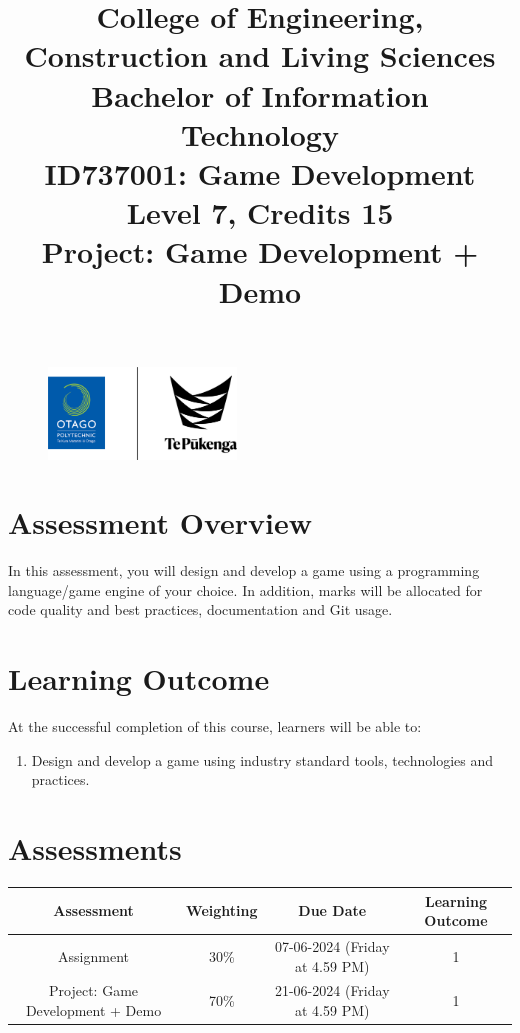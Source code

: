 \documentclass{article}
\author{}
\begin{document}
\begin{figure}
	\centering
	\includegraphics[width=50mm]{../../resources/img/logo.png}
\end{figure}

\title{College of Engineering, Construction and Living Sciences\\Bachelor of Information Technology\\ID737001: Game Development\\Level 7, Credits 15\\\textbf{Project: Game Development + Demo}}
\date{}
\maketitle

\section*{Assessment Overview}
In this assessment, you will design and develop a game using a programming language/game engine of your choice. In addition, marks will be allocated for code quality and best practices, documentation and Git usage.

\section*{Learning Outcome}
At the successful completion of this course, learners will be able to:
\begin{enumerate}
	\item Design and develop a game using industry standard tools, technologies and practices.
\end{enumerate}

\section*{Assessments}
\renewcommand{\arraystretch}{1.5}
\begin{tabular}{|c|c|c|c|}
	\hline
	\textbf{Assessment}                                 & \textbf{Weighting} & \textbf{Due Date}            & \textbf{Learning Outcome} \\ \hline
	\small Assignment  & \small 30\%        & \small 07-06-2024 (Friday at 4.59 PM)   & \small 1                  \\ \hline
	\small Project: Game Development + Demo & \small 70\%        & \small 21-06-2024 (Friday at 4.59 PM)   & \small 1                   \\ \hline
\end{tabular} 
\end{document}
